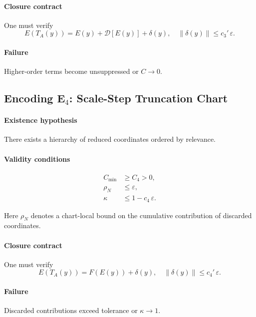 \documentclass[11pt]{article}
\theoremstyle{plain}
\theoremstyle{plain}
\begin{document}
\paragraph{Closure contract}
One must verify
\[
E(T_A(y)) = E(y) + \mathcal{D}[E(y)] + \delta(y),
\quad \|\delta(y)\|\le c_3'\,\varepsilon .
\]

\paragraph{Failure}
Higher-order terms become unsuppressed or $C\to 0$.


\subsection{Encoding \texorpdfstring{E$_4$}{E4}: Scale-Step Truncation Chart}

\paragraph{Existence hypothesis}
There exists a hierarchy of reduced coordinates ordered by relevance.

\paragraph{Validity conditions}
\begin{align}
C_{\min} &\ge C_4 > 0, \\
\rho_N &\le \varepsilon, \\
\kappa &\le 1 - c_4\,\varepsilon .
\end{align}

Here $\rho_N$ denotes a chart-local bound on the cumulative
contribution of discarded coordinates.

\paragraph{Closure contract}
One must verify
\[
E(T_A(y)) = F(E(y)) + \delta(y),
\quad \|\delta(y)\|\le c_4'\,\varepsilon .
\]

\paragraph{Failure}
Discarded contributions exceed tolerance or $\kappa\to 1$.

\end{document}
